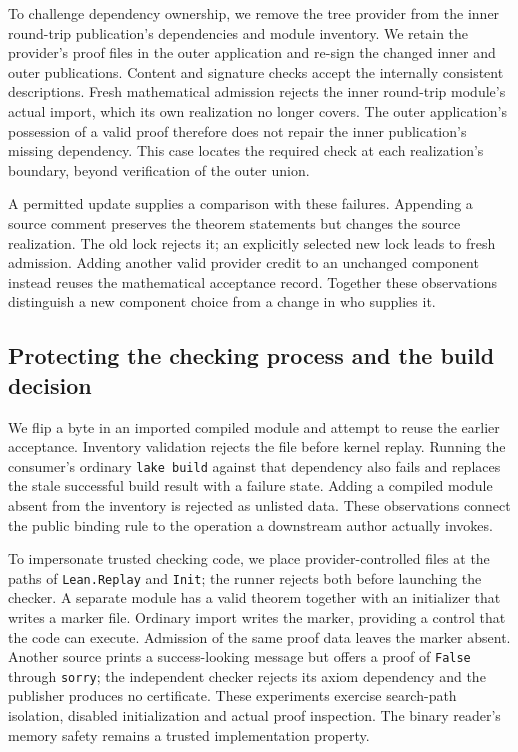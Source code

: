 \documentclass[11pt]{article}
\begin{document}
To challenge dependency ownership, we remove the tree provider from the inner
round-trip publication's dependencies and module inventory. We retain the
provider's proof files in the outer application and re-sign the changed inner
and outer publications. Content and signature checks accept the internally
consistent descriptions. Fresh mathematical admission rejects the inner
round-trip module's actual import, which its own realization no longer covers.
The outer application's possession of a valid proof therefore does not repair
the inner publication's missing dependency. This case locates the required
check at each realization's boundary, beyond verification of the outer union.

A permitted update supplies a comparison with these failures. Appending a source
comment preserves the theorem statements but changes the source realization.
The old lock rejects it; an explicitly selected new lock leads to fresh
admission. Adding another valid provider credit to an unchanged component
instead reuses the mathematical acceptance record. Together these observations
distinguish a new component choice from a change in who supplies it.

\subsection{Protecting the checking process and the build decision}

We flip a byte in an imported compiled module and attempt to reuse the earlier
acceptance. Inventory validation rejects the file before kernel replay. Running
the consumer's ordinary \texttt{lake build} against that dependency also fails
and replaces the stale successful build result with a failure state. Adding a
compiled module absent from the inventory is rejected as unlisted data. These
observations connect the public binding rule to the operation a downstream
author actually invokes.

To impersonate trusted checking code, we place provider-controlled files at the
paths of \texttt{Lean.Replay} and \texttt{Init}; the runner rejects both before
launching the checker. A separate module has a valid theorem together with an
initializer that writes a marker file. Ordinary import writes the marker,
providing a control that the code can execute. Admission of the same proof
data leaves the marker absent. Another source prints a success-looking message
but offers a proof of \texttt{False} through \texttt{sorry}; the independent
checker rejects its axiom dependency and the publisher produces no certificate.
These experiments exercise search-path isolation, disabled initialization and
actual proof inspection. The binary reader's memory safety remains a trusted
implementation property.
\end{document}
